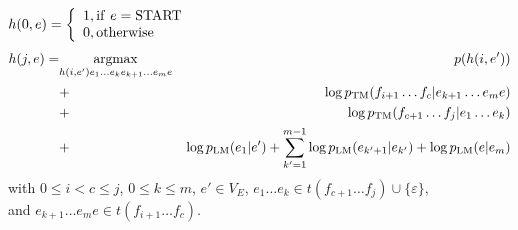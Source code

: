 $h (0 , e) = \left\{ \begin{array}{l}
1 , \operatorname{if} \, e = \operatorname{START}\\
0 , \operatorname{otherwise}
\end{array} \right.$
\begin{eqnarray}
h (j, e) = & \underset{h (i, e') e_1 \ldots e_k e_{k + 1} \ldots e_m
	e}{\operatorname{argmax}}_{} & p (h (i, e')) \nonumber\\
& + & \log p_{\operatorname{TM}} (f_{i + 1} \ldots f_c |e_{k + 1} \ldots e_m e)
\nonumber\\
&  + & \log p_{\operatorname{TM}} (f_{c + 1} \ldots f_j |e_1 \ldots e_k)
\nonumber\\
& + & \log p_{\operatorname{LM}} (e_1 |e') + \sum_{k' = 1}^{m - 1} \log
p_{\operatorname{LM}} (e_{k' + 1} |e_{k'}) + \log p_{\operatorname{LM}} (e|e_m) \nonumber
\end{eqnarray}
with $0 \leq i < c \leq j$, $0 \leq k \leq m$, $e' \in V_E$, $e_1 \ldots e_k
\in t (f_{c + 1} \ldots f_j) \cup \{ \varepsilon \}$,\\
and $e_{k + 1} \ldots e_m e \in t (f_{i + 1} \ldots f_c)$.
